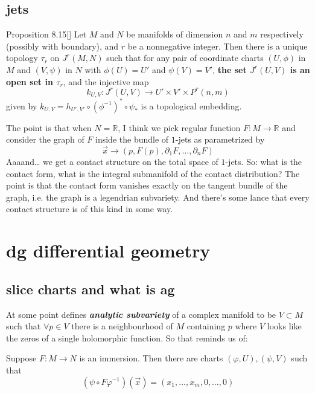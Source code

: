 \section{jets}
\begin{thing6}{Proposition 8.15}[\cite{muk}]\label{prop:8.15}\leavevmode
	Let \(M\) and \(N\) be manifolds of dimension \(n\) and \(m\) respectively (possibly with boundary), and \(r\) be a nonnegative integer. Then there is a unique topology \(\tau_r\) on \(J^r(M,N)\) such that for any pair of coordinate charts \((U,\phi)\) in \(M\) and \((V,\psi)\) in \(N\) with \(\phi(U)=U'\) and \(\psi(V)=V'\), \textbf{the set \(J^r(U,V)\) is an open set in \(\tau_r\)}, and the injective map
	\[k_{U,V}:J^r(U,V) \longrightarrow U'\times V' \times P^r(n,m)\]
given by \(k_{U,V}=h_{U',V'}\circ(\phi^{-1})^* \circ \psi_*\) is a topological embedding.
\end{thing6}

The point is that when \(N=\mathbb{R}\), I think we pick regular function \(F:M \to \mathbb{R}\) and consider the graph of \(F\) inside the bundle of \(1\)-jets as parametrized by
\[\vec{x} \to(p,F(p),\partial_1F,\ldots,\partial_nF)\]
Aaaand… we get a contact structure on the total space of \(1\)-jets. So: what is the contact form, what is the integral submanifold of the contact distribution? The point is that the contact form vanishes exactly on the tangent bundle of the graph, i.e. the graph is a legendrian subvariety. And there's some lance that every contact structure is of this kind in some way.

\chapter{dg differential geometry}

\section{slice charts and what is ag}

At some point \cite{gri} defines \textit{\textbf{analytic subvariety}} of a complex manifold to be \(V \subset M\) such that \(\forall p \in V\) there is a neighbourhood of \(M\) containing \(p\) where \(V\) looks like the zeros of a single holomorphic function. So that reminds us of:

\begin{thm}\leavevmode
Suppose \(F:M \to N\) is an immersion. Then there are charts \((\varphi,U),(\psi,V)\) such that
\[(\psi \circ F \varphi^{-1})(\vec{x})=(x_1,\ldots,x_m,0,\ldots,0)\]
\end{thm}

